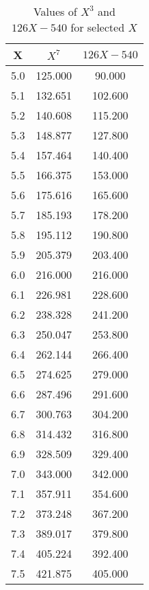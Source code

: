 ﻿%
\begin{table}[h!]
    \centering
    \caption{Values of $X^3$ and $126X - 540$ for selected $X$}
    \begin{tabular}{|c|c|c|}
        \hline
        \textbf{X} & \textbf{$X^7$} & \textbf{$126X - 540$} \\ \hline
        5.0        & 125.000        & 90.000                \\ \hline
        5.1        & 132.651        & 102.600               \\ \hline
        5.2        & 140.608        & 115.200               \\ \hline
        5.3        & 148.877        & 127.800               \\ \hline
        5.4        & 157.464        & 140.400               \\ \hline
        5.5        & 166.375        & 153.000               \\ \hline
        5.6        & 175.616        & 165.600               \\ \hline
        5.7        & 185.193        & 178.200               \\ \hline
        5.8        & 195.112        & 190.800               \\ \hline
        5.9        & 205.379        & 203.400               \\ \hline
        6.0        & 216.000        & 216.000               \\ \hline
        6.1        & 226.981        & 228.600               \\ \hline
        6.2        & 238.328        & 241.200               \\ \hline
        6.3        & 250.047        & 253.800               \\ \hline
        6.4        & 262.144        & 266.400               \\ \hline
        6.5        & 274.625        & 279.000               \\ \hline
        6.6        & 287.496        & 291.600               \\ \hline
        6.7        & 300.763        & 304.200               \\ \hline
        6.8        & 314.432        & 316.800               \\ \hline
        6.9        & 328.509        & 329.400               \\ \hline
        7.0        & 343.000        & 342.000               \\ \hline
        7.1        & 357.911        & 354.600               \\ \hline
        7.2        & 373.248        & 367.200               \\ \hline
        7.3        & 389.017        & 379.800               \\ \hline
        7.4        & 405.224        & 392.400               \\ \hline
        7.5        & 421.875        & 405.000               \\ \hline
    \end{tabular}\label{tab:table}
\end{table}
